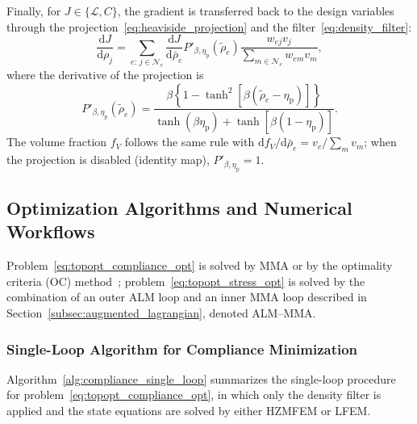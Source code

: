 Finally, for $J \in \{\mathcal{L}, C\}$, the gradient is transferred back to the design variables through the projection~\eqref{eq:heaviside_projection} and the filter~\eqref{eq:density_filter}:
\begin{equation}
\label{eq:design_chain_rule}
\frac{\mathrm{d}J}{\mathrm{d}\rho_j}
= \sum_{e:\, j \in \mathcal{N}_e} \frac{\mathrm{d}J}{\mathrm{d}\bar{\rho}_e}
P'_{\beta,\eta_{\mathrm p}}(\tilde{\rho}_e)
\frac{w_{ej} v_j}{\sum_{m \in \mathcal{N}_e} w_{em} v_m},
\end{equation}
where the derivative of the projection is
\begin{equation*}
P'_{\beta,\eta_{\mathrm p}}(\tilde{\rho}_e)
= \frac{\beta\left\{1 - \tanh^2\!\left[\beta(\tilde{\rho}_e - \eta_{\mathrm p})\right]\right\}}
{\tanh(\beta \eta_{\mathrm p}) + \tanh\!\left[\beta(1 - \eta_{\mathrm p})\right]}.
\end{equation*}
The volume fraction $f_V$ follows the same rule with $\mathrm{d}f_V/\mathrm{d}\bar{\rho}_e = v_e/\sum_m v_m$; when the projection is disabled (identity map), $P'_{\beta,\eta_{\mathrm p}} = 1$.

\subsection{Optimization Algorithms and Numerical Workflows}
\label{subsec:algorithms}

Problem~\eqref{eq:topopt_compliance_opt} is solved by MMA or by the optimality criteria (OC) method~\cite{BendsoeSigmund2004}; problem~\eqref{eq:topopt_stress_opt} is solved by the combination of an outer ALM loop and an inner MMA loop described in Section~\ref{subsec:augmented_lagrangian}, denoted ALM--MMA.

\subsubsection{Single-Loop Algorithm for Compliance Minimization}

Algorithm~\ref{alg:compliance_single_loop} summarizes the single-loop procedure for problem~\eqref{eq:topopt_compliance_opt}, in which only the density filter is applied and the state equations are solved by either HZMFEM or LFEM.

